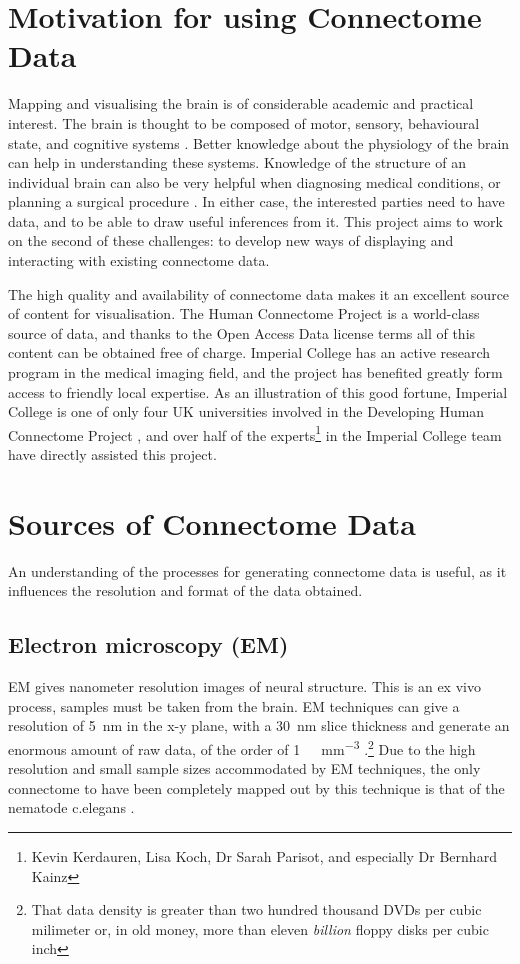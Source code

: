 \documentclass[MSc,paper=a4,pagesize=auto]{icldt}
\begin{document}
\section{Motivation for using Connectome Data}
Mapping and visualising the brain is of considerable academic and practical interest. The brain is thought to be composed of motor, sensory, behavioural state, and cognitive systems \cite{Swanson2003}. Better knowledge about the physiology of the brain can help in understanding these systems. Knowledge of the structure of an individual brain can also be very helpful when diagnosing medical conditions, or planning a surgical procedure \cite{Golby2011}. In either case, the interested parties need to have data, and to be able to draw useful inferences from it. This project aims to work on the second of these challenges: to develop new ways of displaying and interacting with existing connectome data. 

The high quality and availability of connectome data makes it an excellent source of content for visualisation. The Human Connectome Project is a world-class source of data, and thanks to the Open Access Data license terms \cite{HCPAccess2014} all of this content can be obtained free of charge. Imperial College has an active research program in the medical imaging field, and the project has benefited greatly form access to friendly local expertise. As an illustration of this good fortune, Imperial College is one of only four UK universities involved in the Developing Human Connectome Project \cite{DHCPPartners2014}, and over half of the experts\footnote{Kevin Kerdauren, Lisa Koch, Dr Sarah Parisot, and especially Dr Bernhard  Kainz} in the Imperial College team have directly assisted this project. 

\section{Sources of Connectome Data}
An understanding of the processes for generating connectome data is useful, as it influences the resolution and format of the data obtained. 

\subsection{Electron microscopy (EM)} 
EM gives nanometer resolution images of neural structure. This is an ex vivo process, samples must be taken from the brain. EM techniques can give a resolution of \SI{5}{\nm} in the x-y plane, with a \SI{30}{\nm} slice thickness and generate an enormous amount of raw data, of the order of \SI{1}{\pebi\byte\per\mm\cubed} \cite{Jeong2010}.\footnote{That data density is greater than two hundred thousand DVDs per cubic milimeter or, in old money, more than eleven \textit{billion} floppy disks per cubic inch} Due to the high resolution and small sample sizes accommodated by EM techniques, the only connectome to have been completely mapped out by this technique is that of the nematode c.elegans \cite{White1986}.
\end{document}

